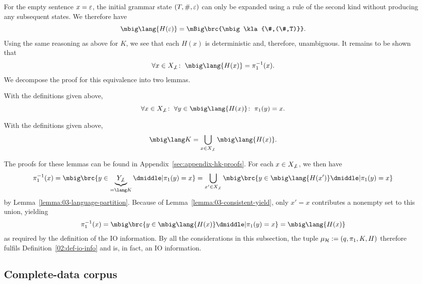 For the empty sentence $x=\varepsilon$, the initial grammar state $(T,\#,\varepsilon)$ can
only be expanded using a rule of the second kind without producing any subsequent states.
We therefore have
\[
 \mbig\lang{H(\eps)} = \mBig\brc{\mbig\kla{\#,(\#,T)}}.
\]
%
Using the same reasoning as above for $K$, we see that each $H(x)$ is
deterministic and, therefore, unambiguous. It remains to be shown that
\[
 \forall x\in X_{\not\bot}\colon\;
 \mbig\lang{H(x)} = \pi_1^{-1}(x).
\]
We decompose the proof for this equivalence into two lemmas.

\begin{lemma}\label{lemma:03-consistent-yield}
 With the definitions given above,
 \[
  \forall x\in X_{\not\bot}\colon\;
  \forall y\in \mbig\lang{H(x)}\colon\;
  \pi_1(y) = x.
 \]
\end{lemma}

\begin{lemma}\label{lemma:03-language-partition}
 With the definitions given above,
 \[
  \mbig\lang K = \bigcup_{x\in X_{\not\bot}} \mbig\lang{H(x)}.
 \]
\end{lemma}

The proofs for these lemmas can be found in Appendix~\ref{sec:appendix-hk-proofs}. For each $x\in X_{\not\bot}$, we then have
\[
 \pi_1^{-1}(x)
 = \mbig\brc{y\in \underbrace{Y_{\not\bot}}_{=\lang K} \pipe \pi_1(y) = x}
 = \bigcup_{x'\in X_{\not\bot}} \mbig\brc{y\in\mbig\lang{H(x')} \pipe \pi_1(y) = x}
\]
by Lemma~\ref{lemma:03-language-partition}. Because of
Lemma~\ref{lemma:03-consistent-yield}, only $x'=x$ contributes
a nonempty set to this union, yielding
\[
 \pi_1^{-1}(x) = \mbig\brc{y\in\mbig\lang{H(x)} \pipe \pi_1(y) = x} = \mbig\lang{H(x)}
\]
as required by the definition of the IO information. By all the considerations
in this subsection, the tuple $\mu_\mathcal H := (q,\pi_1,K,H)$ therefore fulfils
Definition~\ref{02:def-io-info} and is, in fact, an IO information.

\subsection{Complete-data corpus}\label{sect:03-complete-data-intro}

